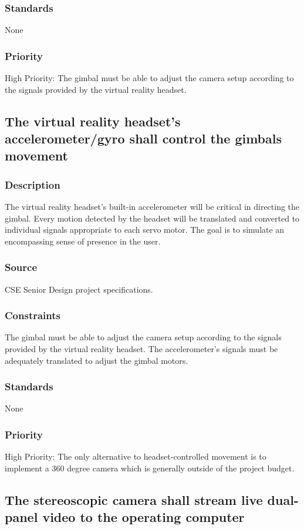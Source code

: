 \subsubsection{Standards}
None
\subsubsection{Priority}
High Priority:  The gimbal must be able to adjust the camera setup according to the signals provided by the virtual reality headset.

\subsection{The virtual reality headset's accelerometer/gyro shall control the gimbals movement}
\subsubsection{Description}
The virtual reality headset's built-in accelerometer will be critical in directing the gimbal. Every motion detected by the headset will be translated and converted to individual signals appropriate to each servo motor. The goal is to simulate an encompassing sense of presence in the user.
\subsubsection{Source}
CSE Senior Design project specifications.
\subsubsection{Constraints}
The gimbal must be able to adjust the camera setup according to the signals provided by the virtual reality headset. The accelerometer's signals must be adequately translated to adjust the gimbal motors.
\subsubsection{Standards}
None
\subsubsection{Priority}
High Priority: The only alternative to headset-controlled movement is to implement a 360 degree camera which is generally outside of the project budget.

\subsection{The stereoscopic camera shall stream live dual-panel video to the operating computer}
